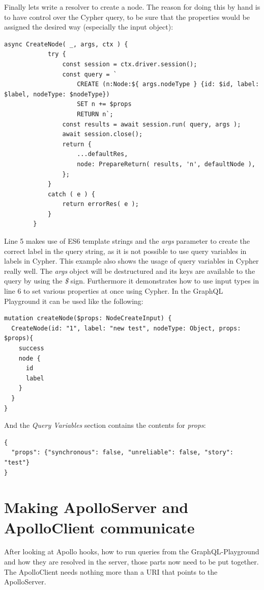 \newpage
Finally lets write a resolver to create a node. The reason for doing this by hand is to have control over the Cypher query, to be sure that the properties would be assigned the desired way (especially the input object):
\lstset{language=JavaScript}
\begin{lstlisting}[caption={Using returned Values from the Query}]
		async CreateNode( _, args, ctx ) {
			try {
				const session = ctx.driver.session();
				const query = `
					CREATE (n:Node:${ args.nodeType } {id: $id, label: $label, nodeType: $nodeType})
					SET n += $props
					RETURN n`;
				const results = await session.run( query, args );
				await session.close();
				return {
					...defaultRes,
					node: PrepareReturn( results, 'n', defaultNode ),
				};
			}
			catch ( e ) {
				return errorRes( e );
			}
		}
\end{lstlisting}
Line 5 makes use of ES6 template strings and the \emph{args} parameter to create the correct label in the query string, as it is not possible to use query variables in labels in Cypher. This example also shows the usage of query variables in Cypher really well. The \emph{args} object will be destructured and its keys are available to the query by using the \emph{\$} sign. Furthermore it demonstrates how to use input types in line 6 to set various properties at once using Cypher. In the GraphQL Playground it can be used like the following:
\lstset{language=GraphQL}
\begin{lstlisting}[caption={Using the Create Node resolver},label={ex:RunCreateNode}]
mutation createNode($props: NodeCreateInput) {
  CreateNode(id: "1", label: "new test", nodeType: Object, props: $props){
    success
    node {
      id
      label
    }
  }
}
\end{lstlisting}

And the \emph{Query Variables} section contains the contents for \emph{props}:
\begin{lstlisting}[caption={Query Variables}]
{
  "props": {"synchronous": false, "unreliable": false, "story": "test"}
}
\end{lstlisting}

\section{Making ApolloServer and ApolloClient communicate}
After looking at Apollo hooks, how to run queries from the GraphQL-Playground and how they are resolved in the server, those parts now need to be put together. The ApolloClient needs nothing more than a URI that points to the ApolloServer.

